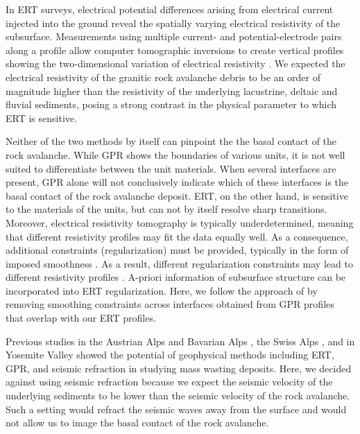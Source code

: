 \documentclass[utf8]{frontiersSCNS}
\begin{document}
In ERT surveys, electrical potential differences arising from electrical current injected into the ground reveal the spatially varying electrical resistivity of the subsurface. Measurements using multiple current- and potential-electrode pairs along a profile allow computer tomographic inversions to create vertical profiles showing the two-dimensional variation of electrical resistivity \citep{oldenburg1999estimating, loke2013recent}. We expected the electrical resistivity of the granitic rock avalanche debris to be an order of magnitude higher than the resistivity of the underlying lacustrine, deltaic and fluvial sediments, posing a strong contrast in the physical parameter to which ERT is sensitive.


Neither of the two methods by itself can pinpoint the the basal contact of the rock avalanche. While GPR shows the boundaries of various units, it is not well suited to differentiate between the unit materials. When several interfaces are present, GPR alone will not conclusively indicate which of these interfaces is the basal contact of the rock avalanche deposit. ERT, on the other hand, is sensitive to the materials of the units, but can not by itself resolve sharp transitions. Moreover, electrical resistivity tomography is typically underdetermined, meaning that different resistivity profiles may fit the data equally well. As a consequence, additional constraints (regularization) must be provided, typically in the form of imposed smoothness \citep[e.g.][]{gunther2006three, loke2013recent}. As a result, different regularization constraints may lead to different resistivity profiles \citep{oldenburg1999estimating}. A-priori information of subsurface structure can be incorporated into ERT regularization. Here, we follow the approach of \cite{doetsch2012constraining} by removing smoothing constraints across interfaces obtained from GPR profiles that overlap with our ERT profiles.

Previous studies in the Austrian Alps and Bavarian Alps \citep{sass2006determination, sass2001investigations}, the Swiss Alps \citep{otto2006comparing, socco2010geophysical}, and in Yosemite Valley \citep{brody2015near, Liu2018nearAGU} showed the potential of geophysical methods including ERT, GPR, and seismic refraction in studying mass wasting deposits. Here, we decided against using seismic refraction because we expect the seismic velocity of the underlying sediments to be lower than the seismic velocity of the rock avalanche. Such a setting would refract the seismic waves away from the surface and would not allow us to image the basal contact of the rock avalanche.
\end{document}
